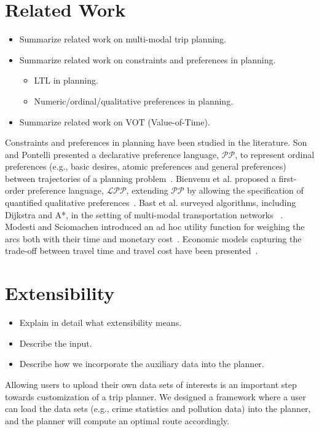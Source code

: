 \documentclass[letterpaper]{article}
\begin{document}
\section{Related Work}
\begin{itemize}
	\setlength\itemsep{1pt}
	\item Summarize related work on multi-modal trip planning.
	\item Summarize related work on constraints and preferences in planning.
		\begin{itemize}
			\setlength\itemsep{0pt}
			\item LTL in planning.
			\item Numeric/ordinal/qualitative preferences in planning.
		\end{itemize}
	\item Summarize related work on VOT (Value-of-Time).
\end{itemize}
Constraints and preferences in planning have been studied in the 
literature.
Son and Pontelli presented a declarative preference language, 
$\mathcal{PP}$, to represent ordinal preferences (e.g., basic desires,
atomic preferences and general preferences) between trajectories of 
a planning problem~\cite{son2004planning}.
Bienvenu et al. proposed a first-order preference language, $\mathcal{LPP}$, 
extending $\mathcal{PP}$ by allowing the specification of quantified qualitative
preferences~\cite{bienvenu2011specifying}.
Bast et al. surveyed algorithms, including Dijkstra and A*, in the setting of
multi-modal transportation networks ~\cite{bast2015route}.
Modesti and Sciomachen introduced an ad hoc utility function for weighing
the arcs both with their time and monetary cost~\cite{modesti1998utility}.
Economic models capturing the trade-off between travel time and travel
cost have been presented~\cite{antoniou2007methodology}.


\section{Extensibility}
\begin{itemize}
	\setlength\itemsep{1pt}
	\item Explain in detail what extensibility means.
	\item Describe the input.
	\item Describe how we incorporate the auxiliary data into the planner.
\end{itemize}
Allowing users to upload their own data sets of interests is an important
step towards customization of a trip planner.
We designed a framework where a user can load the data sets (e.g., crime
statistics and pollution data) into the planner,
and the planner will compute an optimal route accordingly.
\end{document}
